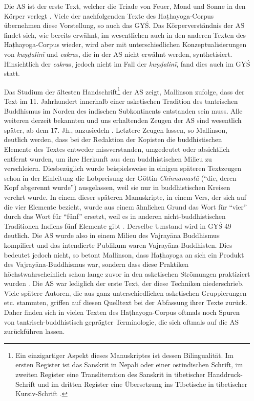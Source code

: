 \documentclass[a4paper,12pt]{article}
\begin{document}
{Die AS ist der erste Text, welcher die Triade von Feuer, Mond und Sonne in den Körper verlegt \parencite[4]{mallinson2016as}. Viele der nachfolgenden Texte des Haṭhayoga-Corpus übernehmen diese Vorstellung, so auch das GYŚ. Das Körperverständnis der AS findet sich, wie bereits erwähnt, im wesentlichen auch in den anderen Texten des Haṭhayoga-Corpus wieder, wird aber mit unterschiedlichen Konzeptualisierungen von \textit{kuṇḍalinī} und \textit{cakra}s, die in der AS nicht erwähnt werden, synthetisiert. Hinsichtlich der \textit{cakra}s, jedoch nicht im Fall der \textit{kuṇḍalinī}, fand dies auch im GYŚ statt. 

Das Studium der ältesten Handschrift\footnote{Ein einzigartiger Aspekt dieses Manuskriptes ist dessen Bilingualität. Im ersten Register ist das Sanskrit in Nepali oder einer ostindischen Schrift, im zweiten Register eine Transliteration des Sanskrit in tibetischer Handdruck-Schrift und im dritten Register eine Übersetzung ins Tibetische in tibetischer Kursiv-Schrift \parencite[2]{mallinson2016as}.} der AS zeigt, Mallinson zufolge, dass der Text im 11. Jahrhundert innerhalb einer asketischen Tradition des tantrischen Buddhismus im Norden des indischen Subkontinents entstanden sein muss. Alle weiteren derzeit bekannten und uns erhaltenden Zeugen der AS sind wesentlich später, ab dem 17. Jh., anzusiedeln \parencite[2]{mallinson2016as}. Letztere Zeugen lassen, so Mallinson, deutlich werden, dass bei der Redaktion der Kopisten die buddhistischen Elemente des Textes entweder missverstanden, umgedeutet oder absichtlich entfernt wurden, um ihre Herkunft aus dem buddhistischen Milieu zu verschleiern. Diesbezüglich wurde beispielsweise in einigen späteren Textzeugen schon in der Einleitung die Lobpreisung der Göttin \textit{Chinnamastā} (``die, deren Kopf abgerennt wurde'') ausgelassen, weil sie nur in buddhistischen Kreisen verehrt wurde. In einem dieser späteren Manuskripte, in einem Vers, der sich auf die vier Elemente bezieht, wurde aus einem ähnlichen Grund das Wort für ``vier'' durch das Wort für ``fünf'' ersetzt, weil es in anderen nicht-buddhistischen Traditionen Indiens fünf Elemente gibt \parencite[17]{viveka57}. Derselbe Umstand wird in GYŚ 49 deutlich. Die AS wurde also in einem Milieu des Vajrayāna Buddhismus kompiliert und das intendierte Publikum waren Vajrayāna-Buddhisten. Dies bedeutet jedoch nicht, so betont Mallinson, dass Haṭhayoga an sich ein Produkt des Vajrayāna-Buddhismus war, sondern dass diese Praktiken höchstwahrscheinlich schon lange zuvor in den asketischen Strömungen praktiziert wurden \parencite[10]{mallinson2016as}. Die AS war lediglich der erste Text, der diese Techniken niederschrieb. Viele spätere Autoren, die aus ganz unterschiedlichen asketischen Gruppierungen etc. stammten, griffen auf diesen Quelltext bei der Abfassung ihrer Texte zurück. Daher finden sich in vielen Texten des Haṭhayoga-Corpus oftmals noch Spuren von tantrisch-buddhistisch geprägter Terminologie, die sich oftmals auf die AS zurückführen lassen.

}
\end{document}
